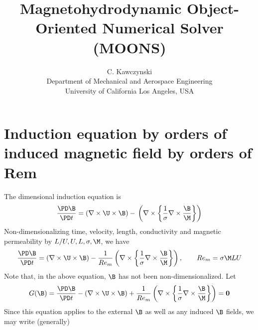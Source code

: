 \documentclass[11pt]{article}
\begin{document}
\doublespacing
\title{Magnetohydrodynamic Object-Oriented Numerical Solver (MOONS)}
\author{C. Kawczynski \\
Department of Mechanical and Aerospace Engineering \\
University of California Los Angeles, USA\\
}

\section{Induction equation by orders of induced magnetic field by orders of Rem}
The dimensional induction equation is
\begin{equation} \label{eq:ind_dim}
  \frac{\PD \B}{\PD t}
  =
  (\nabla \times \U \times \B)
  - \\
  \left(
  \nabla \times
  \left\{
  \frac{1}{\sigma}
  \nabla \times
  \frac{\B}{\M}
  \right\}
  \right)
\end{equation}
Non-dimensionalizing time, velocity, length, conductivity and magnetic permeability by $L/U,U,L,\sigma,\M$, we have
\begin{equation} \label{eq:ind}
  \frac{\PD \B}{\PD t}
  =
  (\nabla \times \U \times \B)
  - \\
  \frac{1}{Re_m}
  \left(
  \nabla \times
  \left\{
  \frac{1}{\sigma}
  \nabla \times
  \frac{\B}{\M}
  \right\}
  \right)
  ,\qquad Re_m = \sigma \M LU
\end{equation}
Note that, in the above equation, $\B$ has not been non-dimensionalized. Let
\begin{equation}
  G(\B)
  =
  \frac{\PD \B}{\PD t}
  -
  (\nabla \times \U \times \B)
  +
  \frac{1}{Re_m}
  \left(
  \nabla \times
  \left\{
  \frac{1}{\sigma}
  \nabla \times
  \frac{\B}{\M}
  \right\}
  \right)
  =
  \mathbf{0}
\end{equation}
Since this equation applies to the external $\B$ as well as any induced $\B$ fields, we may write (generally)
\end{document}
